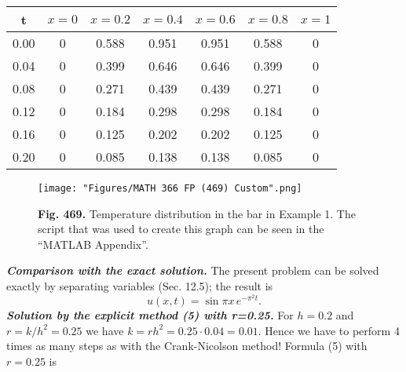 \newpage
\begin{table}[htp]
\begin{center}
\begin{tabular}{|c c c c c c c|}
\hline t & $x=0$ & $x=0.2$ & $x=0.4$ & $x=0.6$ & $x=0.8$ & $x=1$ \\ \hline
0.00 & 0 & 0.588 & 0.951 & 0.951 & 0.588 & 0 \\ 
0.04 & 0 & 0.399 & 0.646 & 0.646 & 0.399 & 0 \\ 
0.08 & 0 & 0.271 & 0.439 & 0.439 & 0.271 & 0 \\
0.12 & 0 & 0.184 & 0.298 & 0.298 & 0.184 & 0 \\
0.16 & 0 & 0.125 & 0.202 & 0.202 & 0.125 & 0 \\
0.20 & 0 & 0.085 & 0.138 & 0.138 & 0.085 & 0 \\ \hline
\end{tabular}
\end{center}
\end{table}%
\begin{figure}[htbp]
\begin{center}
\texttt{[image: "Figures/MATH 366 FP (469) Custom".png]}
\caption*{\small{\textbf{\color{blue} Fig. 469.}} Temperature distribution in the bar in Example 1. The script that was used to create this graph can be seen in the ``MATLAB Appendix''.}
\end{center}
\end{figure}
\textit{\textbf{Comparison with the exact solution.}} The present problem can be solved exactly by separating variables (Sec. 12.5); the result is
\begin{equation*}\tag{21.10}
u(x,t)=\sin{\pi x}\hspace{2pt}e^{-\pi^2t}.
\end{equation*}
\textit{\textbf{Solution by the explicit method (5) with r=0.25.}} For $h=0.2$ and $r=k/h^2=0.25$ we have $k=rh^2=0.25\cdot0.04=0.01$. Hence we have to perform 4 times as many steps as with the Crank-Nicolson method! Formula (5) with $r=0.25$ is

